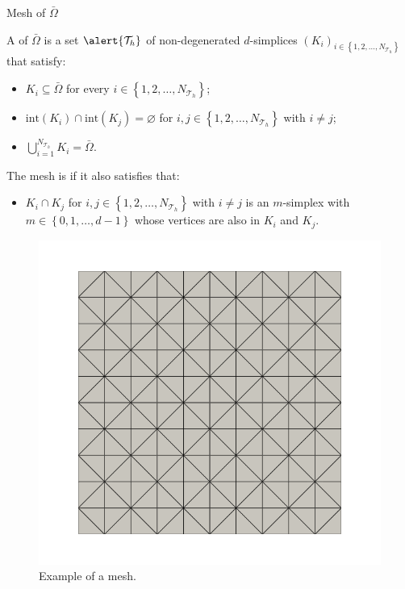 \begin{frame}[allowframebreaks]{Mesh of $\bar{\Omega}$}

\begin{definicion}
	A  of $\bar{\Omega}$ is a set $\alert{\mathcal{T}_h}$ of non-degenerated $d$-simplices $\left(K_i\right)_{i\in\left\{1,2,\ldots,N_{\mathcal{T}_h}\right\}}$ that satisfy:
	\begin{itemize}
		\item $K_i\subseteq\bar\Omega$ for every $i\in\left\{1,2,\ldots,N_{\mathcal{T}_h}\right\}$;
		\item $\text{int}\left(K_i\right)\cap\text{int}\left(K_j\right)=\varnothing$ for $i,j\in\left\{1,2,\ldots,N_{\mathcal{T}_h} \right\}$ with $i\neq j$;
		\item $\displaystyle \bigcup_{i=1}^{N_{\mathcal{T}_h}} K_i=\bar\Omega$.
	\end{itemize}	
	The mesh is  if it also satisfies that:
	\begin{itemize}
		\item $K_i\cap K_j$ for $i,j\in\left\{1,2,\ldots,N_{\mathcal{T}_h} \right\}$ with $i\neq j$ is an $m$-simplex with $m\in\left\{0,1,\ldots,d-1 \right\}$ whose vertices are also in $K_i$ and $K_j$.
	\end{itemize}
\end{definicion}

\begin{figure}
	\centering
	\includegraphics[scale=0.3]{img/mesh.png}
	\caption{Example of a mesh.}
\end{figure}

\end{frame}


